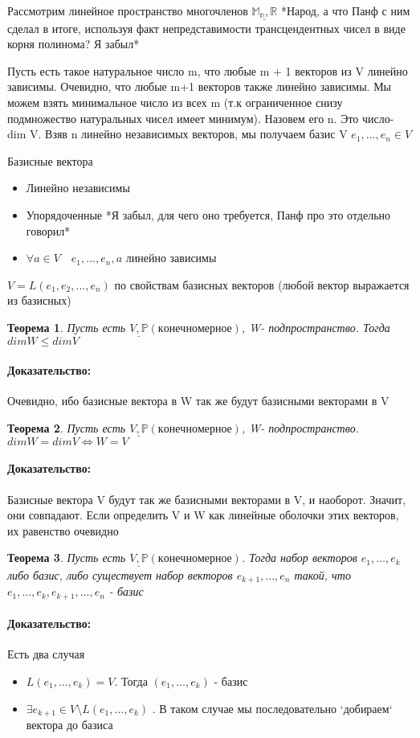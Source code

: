 \documentclass[l1pt]{article}
\newtheorem{theorem}{Теорема}
\newenvironment{proof}{\paragraph{Доказательство:}}{\hfill\newline}
\begin{document}
\begin{flushleft}
Рассмотрим линейное пространство многочленов $\underline{\mathbb{M_n}, \mathbb{R}}$ *Народ, а что Панф с ним сделал в итоге, используя факт непредставимости трансцендентных чисел в виде корня полинома? Я забыл*

Пусть есть такое натуральное число m, что любые m + 1 векторов из V линейно зависимы. Очевидно, что любые m+1 векторов также линейно зависимы. Мы можем взять минимальное число из всех m (т.к ограниченное  снизу подмножество натуральных чисел имеет минимум). Назовем его n. Это число- dim V. Взяв n линейно независимых векторов, мы получаем базис V $e_1, ... , e_n \in V$

Базисные вектора 
\begin{itemize}
 \item Линейно независимы
 \item Упорядоченные *Я забыл, для чего оно требуется, Панф про это отдельно говорил*
 \item $\forall a \in V \quad e_1, ... , e_n, a$ линейно зависимы
\end{itemize}

$V = L(e_1, e_2, ..., e_n)$ по свойствам базисных векторов (любой вектор выражается из базисных)
\end{flushleft}


\begin{theorem}
    Пусть есть $\underline{V, \mathbb{P}} (конечномерное)$, W- подпространство. Тогда $dim W \leqslant dim V$
\end{theorem}
\begin{proof}
    Очевидно, ибо базисные вектора в W так же будут базисными векторами в V
\end{proof}

\begin{theorem}
    Пусть есть $\underline{V, \mathbb{P}} (конечномерное)$, W- подпространство. $dim W = dim V \iff W = V$
\end{theorem}
\begin{proof}
    Базисные вектора V будут так же базисными векторами в V, и наоборот. Значит, они совпадают. Если определить V и W как линейные оболочки этих векторов, их равенство очевидно
\end{proof}

\begin{theorem}
    Пусть есть $\underline{V, \mathbb{P}} (конечномерное)$. Тогда набор векторов  $e_1, ... , e_k$ либо базис, либо существует набор векторов $e_{k + 1}, ... , e_n$ такой, что $e_1, ... , e_k, e_{k+1}, ... , e_n$ - базис
\end{theorem}
\begin{proof}
    Есть два случая 
    \begin{itemize}
        \item $L(e_1, ... , e_k) = V$. Тогда $(e_1, ... , e_k)$ - базис
        \item $\exists e_{k+1} \in V \setminus L(e_1, ... , e_k)$ . В таком случае мы последовательно `добираем` вектора до базиса
\end{itemize}
\end{proof}
\end{document}
